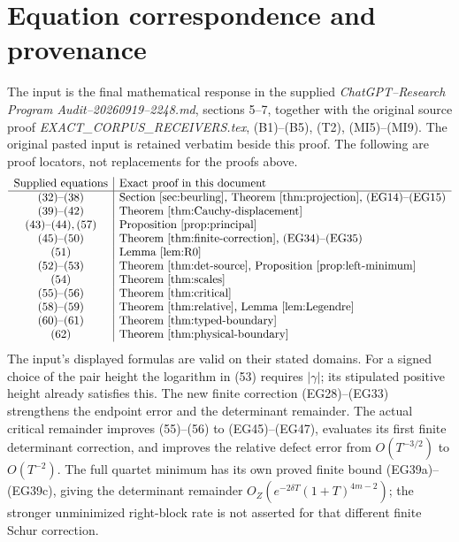 \documentclass[11pt]{article}
\begin{document}
\section{Equation correspondence and provenance}\label{sec:correspondence}
The input is the final mathematical response in the supplied
\emph{ChatGPT--Research Program Audit--20260919--2248.md}, sections
5--7, together with the original source proof
\emph{EXACT\_CORPUS\_RECEIVERS.tex}, (B1)--(B5), (T2), (MI5)--(MI9).
The original pasted input is retained verbatim beside this proof.
The following are proof locators, not replacements for the proofs above.
\[
\begin{array}{c|l}
\text{Supplied equations}&\text{Exact proof in this document}\\\hline
(32)\text{--}(38)&\text{Section \ref{sec:beurling}, Theorem \ref{thm:projection}, (EG14)--(EG15)}\\
(39)\text{--}(42)&\text{Theorem \ref{thm:Cauchy-displacement}}\\
(43)\text{--}(44),(57)&\text{Proposition \ref{prop:principal}}\\
(45)\text{--}(50)&\text{Theorem \ref{thm:finite-correction}, (EG34)--(EG35)}\\
(51)&\text{Lemma \ref{lem:R0}}\\
(52)\text{--}(53)&\text{Theorem \ref{thm:det-source}, Proposition \ref{prop:left-minimum}}\\
(54)&\text{Theorem \ref{thm:scales}}\\
(55)\text{--}(56)&\text{Theorem \ref{thm:critical}}\\
(58)\text{--}(59)&\text{Theorem \ref{thm:relative}, Lemma \ref{lem:Legendre}}\\
(60)\text{--}(61)&\text{Theorem \ref{thm:typed-boundary}}\\
(62)&\text{Theorem \ref{thm:physical-boundary}}
\end{array}
\]
The input's displayed formulas are valid on their stated domains.
For a signed choice of the pair height the logarithm in (53) requires
$|\gamma|$; its stipulated positive height already satisfies this.
The new finite correction (EG28)--(EG33) strengthens the endpoint
error and the determinant remainder. The actual critical remainder
improves (55)--(56) to (EG45)--(EG47), evaluates its first finite
determinant correction, and improves the relative defect error from
$O(T^{-3/2})$ to $O(T^{-2})$. The full quartet minimum has its own
proved finite bound (EG39a)--(EG39c), giving the determinant
remainder $O_Z(e^{-2\delta T}(1+T)^{4m-2})$; the stronger
unminimized right-block rate is not asserted for that different
finite Schur correction.
\end{document}
